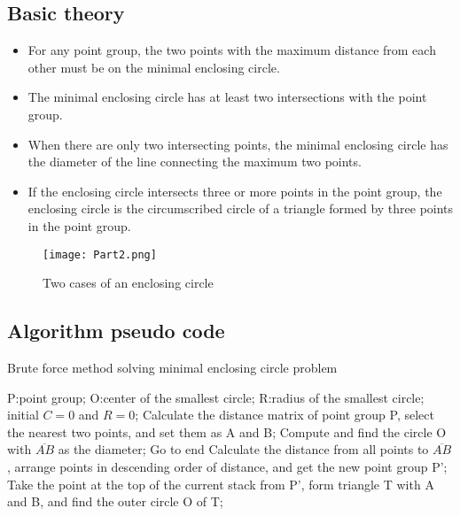 \documentclass[a4paper, 12pt]{article}
\begin{document}
\subsection{Basic theory}
%
\begin{itemize}
    \item{For any point group, the two points with the maximum distance from each other must be on the minimal enclosing circle.}
    \item{The minimal enclosing circle has at least two intersections with the point group.}
    \item{When there are only two intersecting points, the minimal enclosing circle has the diameter of the line connecting the maximum two points.}
    \item{If the enclosing circle intersects three or more points in the point group, the enclosing circle is the circumscribed circle of a triangle formed by three points in the point group.}
\end{itemize}

\begin{figure}[H]
	\centering 
	\texttt{[image: Part2.png]} 
	\caption{Two cases of an enclosing circle} 
	\label{fig:Two cases}  
\end{figure}


\subsection{Algorithm pseudo code}
%
\begin{algorithm}[h]  
  \caption{Brute force method solving minimal enclosing circle problem}  
  \label{alg::Brute force method}  
  \begin{algorithmic}[1]  
    \Require  
      P:point group;  
    \Ensure  
      O:center of the smallest circle;
      R:radius of the smallest circle;
    \State initial $C=0$ and $R=0$;    
    \State Calculate the distance matrix of point group P, select the nearest two points, and set them as A and B;  
    \State Compute and find the circle O with $\overline{AB}$ as the diameter;
    \State Go to end  
    \Else
    \State Calculate the distance from all points to $\overline{AB}$, arrange points in descending order of distance, and get the new point group P';
    \EndIf
    \Repeat  
    \State Take the point at the top of the current stack from P', form triangle T with A and B, and find the outer circle O of T;  
  \end{algorithmic}  
\end{algorithm}  
\end{document}

